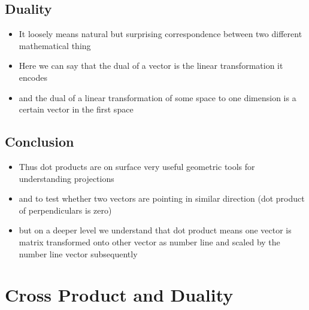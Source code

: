 \documentclass[a4paper]{article}
\begin{document}
\subsection{Duality}
\begin{itemize}
	\item It loosely means natural but surprising correspondence
	      between two different mathematical thing
	\item Here we can say that the dual of a vector is the
	      linear transformation it encodes
	\item and the dual of a linear transformation of some space to
	      one dimension is a certain vector in the first space
\end{itemize}

\subsection{Conclusion}
\begin{itemize}
	\item Thus dot products are on surface very useful
	      geometric tools for understanding projections
	\item and to test whether two vectors are pointing in
	      similar direction (dot product of perpendiculars is
	      zero)
	\item but on a deeper level we understand that dot
	      product means one vector is matrix transformed onto
	      other vector as number line and scaled by the number line
	      vector subsequently
\end{itemize}

\newpage
\section{Cross Product and Duality}
\end{document}
